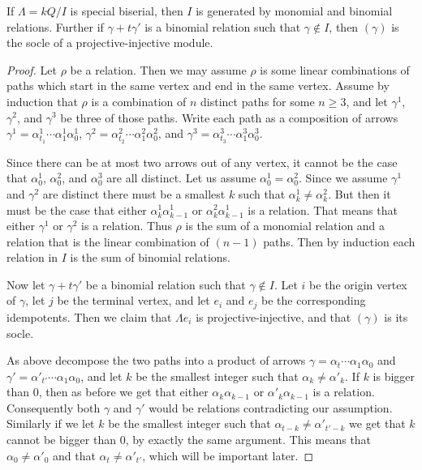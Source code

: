 \begin{prop}\label{prop:special_biserail_algerbas_are_binomial}
	If $\Lambda = kQ/I$ is special biserial, then $I$ is generated by monomial and binomial relations. Further if $\gamma + t\gamma'$ is a binomial relation such that $\gamma \not\in I$, then $(\gamma)$ is the socle of a projective-injective module.
	\begin{proof}
		Let $\rho$ be a relation. Then we may assume $\rho$ is some linear combinations of paths which start in the same vertex and end in the same vertex. Assume by induction that $\rho$ is a combination of $n$ distinct paths for some $n\geq 3$, and let $\gamma^1$, $\gamma^2$, and $\gamma^3$ be three of those paths. Write each path as a composition of arrows $\gamma^1 = \alpha^1_{t_1} \cdots \alpha^1_1\alpha^1_0$,  $\gamma^2 = \alpha^2_{t_2} \cdots \alpha^2_1\alpha^2_0$, and  $\gamma^3 = \alpha^3_{t_3} \cdots \alpha^3_1\alpha^3_0$.
		
		Since there can be at most two arrows out of any vertex, it cannot be the case that $\alpha^1_0$, $\alpha^2_0$, and $\alpha^3_0$ are all distinct. Let us assume $\alpha^1_0 = \alpha^2_0$. Since we assume $\gamma^1$ and $\gamma^2$ are distinct there must be a smallest $k$ such that $\alpha^1_k \neq \alpha^2_k$. But then it must be the case that either $\alpha^1_k\alpha^1_{k-1}$ or $\alpha^2_k\alpha^1_{k-1}$ is a relation. That means that either $\gamma^1$ or $\gamma^2$ is a relation. Thus $\rho$ is the sum of a monomial relation and a relation that is the linear combination of $(n-1)$ paths. Then by induction each relation in $I$ is the sum of binomial relations.
		
		Now let $\gamma + t\gamma'$ be a binomial relation such that $\gamma \not\in I$. Let $i$ be the origin vertex of $\gamma$, let $j$ be the terminal vertex, and let $e_i$ and $e_j$ be the corresponding idempotents. Then we claim that $\Lambda e_i$ is projective-injective, and that $(\gamma)$ is its socle.
		
		As above decompose the two paths into a product of arrows $\gamma = \alpha_{t}\cdots \alpha_1\alpha_0$ and $\gamma' = \alpha'_{t'}\cdots \alpha_1\alpha_0$, and let $k$ be the smallest integer such that $\alpha_k \neq \alpha'_k$. If $k$ is bigger than 0, then as before we get that either $\alpha_k\alpha_{k-1}$ or $\alpha'_k\alpha_{k-1}$ is a relation. Consequently both $\gamma$ and $\gamma'$ would be relations contradicting our assumption. Similarly if we let $k$ be the smallest integer such that $\alpha_{t-k} \neq \alpha'_{t'-k}$ we get that $k$ cannot be bigger than 0, by exactly the same argument. This means that $\alpha_0 \neq \alpha'_0$ and that $\alpha_t \neq \alpha'_{t'}$, which will be important later.


\end{proof}
\end{prop}
